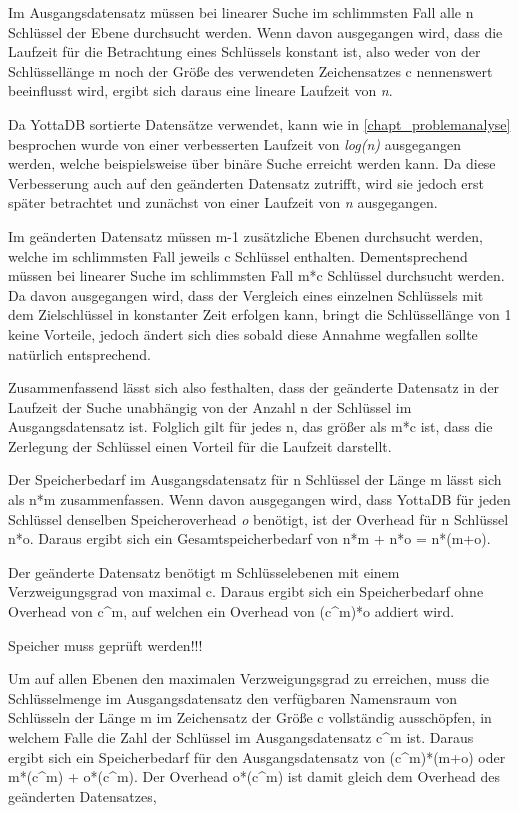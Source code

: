 \documentclass[oneside]{ausarbeitung}
\begin{document}
	Im Ausgangsdatensatz müssen bei linearer Suche im schlimmsten Fall alle n Schlüssel der Ebene durchsucht werden. Wenn davon ausgegangen wird, dass die Laufzeit für die Betrachtung eines Schlüssels konstant ist, also weder von der Schlüssellänge m noch der Größe des verwendeten Zeichensatzes c nennenswert beeinflusst wird, ergibt sich daraus eine lineare Laufzeit von \textit{n}. 
	
	Da YottaDB sortierte Datensätze verwendet, kann wie in \ref{chapt_problemanalyse} besprochen wurde von einer verbesserten Laufzeit von \textit{log(n)} ausgegangen werden, welche beispielsweise über binäre Suche erreicht werden kann. Da diese Verbesserung auch auf den geänderten Datensatz zutrifft, wird sie jedoch erst später betrachtet und zunächst von einer Laufzeit von \textit{n} ausgegangen.
	
	Im geänderten Datensatz müssen m-1 zusätzliche Ebenen durchsucht werden, welche im schlimmsten Fall jeweils c Schlüssel enthalten. Dementsprechend müssen bei linearer Suche im schlimmsten Fall m*c Schlüssel durchsucht werden. Da davon ausgegangen wird, dass der Vergleich eines einzelnen Schlüssels mit dem Zielschlüssel in konstanter Zeit erfolgen kann, bringt die Schlüssellänge von 1 keine Vorteile, jedoch ändert sich dies sobald diese Annahme wegfallen sollte natürlich entsprechend.
	
	Zusammenfassend lässt sich also festhalten, dass der geänderte Datensatz in der Laufzeit der Suche unabhängig von der Anzahl n der Schlüssel im Ausgangsdatensatz ist. Folglich gilt für jedes n, das größer als m*c ist, dass die Zerlegung der Schlüssel einen Vorteil für die Laufzeit darstellt. 
	
	Der Speicherbedarf im Ausgangsdatensatz für n Schlüssel der Länge m lässt sich als n*m zusammenfassen. Wenn davon ausgegangen wird, dass YottaDB für jeden Schlüssel denselben Speicheroverhead \textit{o} benötigt, ist der Overhead für n Schlüssel n*o. Daraus ergibt sich ein Gesamtspeicherbedarf von n*m + n*o = n*(m+o).
	
	Der geänderte Datensatz benötigt m Schlüsselebenen mit einem Verzweigungsgrad von maximal c. Daraus ergibt sich ein Speicherbedarf ohne Overhead von c^m, auf welchen ein Overhead von (c^m)*o addiert wird. 
	
	
	Speicher muss geprüft werden!!!
	
	
	
	Um auf allen Ebenen den maximalen Verzweigungsgrad zu erreichen, muss die Schlüsselmenge im Ausgangsdatensatz den verfügbaren Namensraum von Schlüsseln der Länge m im Zeichensatz der Größe c vollständig ausschöpfen, in welchem Falle die Zahl der Schlüssel im Ausgangsdatensatz c^m ist. Daraus ergibt sich ein Speicherbedarf für den Ausgangsdatensatz von (c^m)*(m+o) oder m*(c^m) + o*(c^m). Der Overhead o*(c^m) ist damit gleich dem Overhead des geänderten Datensatzes, 
	
\end{document}
